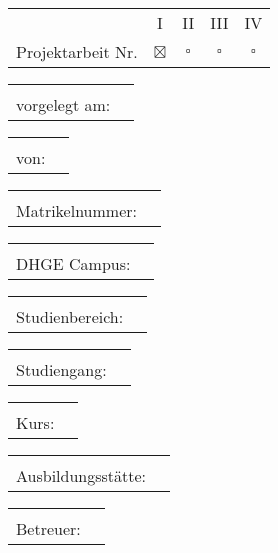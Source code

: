 \vspace{\fill}
\maketitle

\begin{tabular}{rcccc}
	     \hspace{0.45\textwidth} &       I       &     II      &     III     &     IV      \\
	Projektarbeit Nr.  & $ \boxtimes $ & $ \square $ & $ \square $ & $ \square $
\end{tabular}

\begin{tabular}{rl}
	 \hspace{0.45\textwidth} &       \\
	vorgelegt am: & \CDATUM
\end{tabular}

\begin{tabular}{rl}
	\hspace{0.45\textwidth} &              \\
	        von: & \CAUTHOR
\end{tabular}

\begin{tabular}{rl}
	\hspace{0.45\textwidth} &         \\
	 Matrikelnummer: & \CMATRIKEL
\end{tabular}

\begin{tabular}{rl}
	\hspace{0.45\textwidth} &      \\
	DHGE Campus: & \CCAMPUS
\end{tabular}

\begin{tabular}{rl}
	 \hspace{0.45\textwidth} &         \\
	Studienbereich: & \CBEREICH
\end{tabular}

\begin{tabular}{rl}
	\hspace{0.45\textwidth} &                       \\
	Studiengang: & \CSTUDIENGANG
\end{tabular}

\begin{tabular}{rl}
	\hspace{0.45\textwidth} &       \\
	       Kurs: & \CKURS
\end{tabular}

\begin{tabular}{rl}
	\hspace{0.45\textwidth} &          \\
	Ausbildungsstätte: & \CBETRIEB
\end{tabular}

\begin{tabular}{rl}
	\hspace{0.45\textwidth} &          \\
	   Betreuer: & \CBETREUER
\end{tabular}

\vspace*{\fill}

\pagebreak

